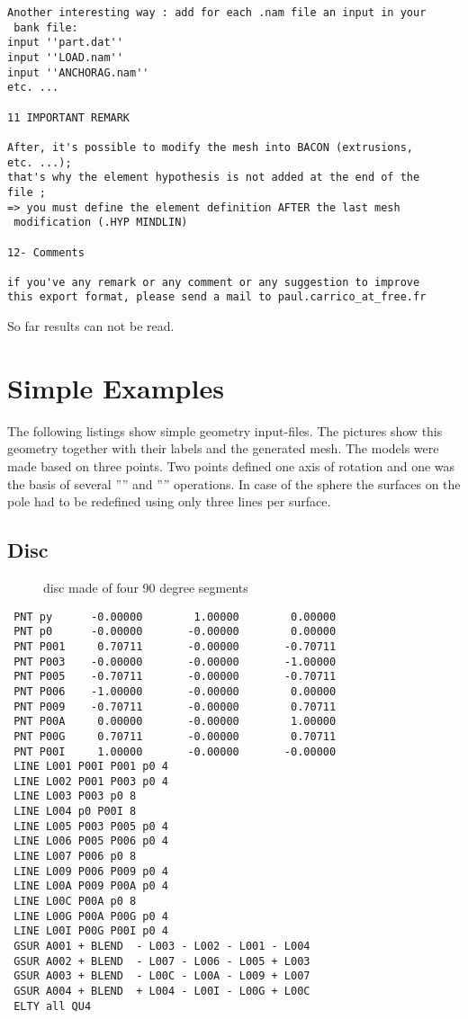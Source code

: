 \documentclass{article}
\begin{document}
\begin{appendix}
\begin{verbatim}
Another interesting way : add for each .nam file an input in your
 bank file:
input ''part.dat''
input ''LOAD.nam''
input ''ANCHORAG.nam''
etc. ...

11 IMPORTANT REMARK

After, it's possible to modify the mesh into BACON (extrusions,
etc. ...);
that's why the element hypothesis is not added at the end of the
file ; 
=> you must define the element definition AFTER the last mesh
 modification (.HYP MINDLIN)

12- Comments

if you've any remark or any comment or any suggestion to improve
this export format, please send a mail to paul.carrico_at_free.fr
\end{verbatim}
So far results can not be read.


\section{\label{Simple Examples}Simple Examples}
The following listings show simple geometry input-files. The pictures show this geometry together with their labels and the generated mesh. The models were made based on three points. Two points defined one axis of rotation and one was the basis of several '''' and '''' operations. In case of the sphere the surfaces on the pole had to be redefined using only three lines per surface.
\subsection{\label{Disc}Disc}
\begin{figure}[h]
\caption{\label{disc made of four 90 degree segments}disc made of four 90 degree segments}
\end{figure}
\begin{verbatim}
 PNT py      -0.00000        1.00000        0.00000 
 PNT p0      -0.00000       -0.00000        0.00000 
 PNT P001     0.70711       -0.00000       -0.70711 
 PNT P003    -0.00000       -0.00000       -1.00000 
 PNT P005    -0.70711       -0.00000       -0.70711 
 PNT P006    -1.00000       -0.00000        0.00000 
 PNT P009    -0.70711       -0.00000        0.70711 
 PNT P00A     0.00000       -0.00000        1.00000 
 PNT P00G     0.70711       -0.00000        0.70711 
 PNT P00I     1.00000       -0.00000       -0.00000 
 LINE L001 P00I P001 p0 4              
 LINE L002 P001 P003 p0 4              
 LINE L003 P003 p0 8              
 LINE L004 p0 P00I 8              
 LINE L005 P003 P005 p0 4              
 LINE L006 P005 P006 p0 4              
 LINE L007 P006 p0 8              
 LINE L009 P006 P009 p0 4              
 LINE L00A P009 P00A p0 4              
 LINE L00C P00A p0 8              
 LINE L00G P00A P00G p0 4              
 LINE L00I P00G P00I p0 4              
 GSUR A001 + BLEND  - L003 - L002 - L001 - L004 
 GSUR A002 + BLEND  - L007 - L006 - L005 + L003 
 GSUR A003 + BLEND  - L00C - L00A - L009 + L007 
 GSUR A004 + BLEND  + L004 - L00I - L00G + L00C 
 ELTY all QU4 
\end{verbatim}


\end{appendix}
\end{document}
